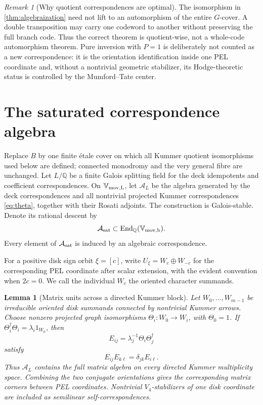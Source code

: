 \documentclass[11pt]{article}
\newtheorem{lemma}[theorem]{Lemma}
\theoremstyle{definition}
\theoremstyle{remark}
\newtheorem{remark}[theorem]{Remark}
\newcommand{\Q}{\mathbb Q}
\newcommand{\End}{\operatorname{End}}
\begin{document}
\begin{remark}[Why quotient correspondences are optimal]
The isomorphism in \cref{thm:algebraization} need not lift to an automorphism of the entire $G$-cover.  A double transposition may carry one codeword to another without preserving the full branch code.  Thus the correct theorem is quotient-wise, not a whole-code automorphism theorem.  Pure inversion with $P=1$ is deliberately not counted as a new correspondence: it is the orientation identification inside one PEL coordinate and, without a nontrivial geometric stabilizer, its Hodge-theoretic status is controlled by the Mumford--Tate center.
\end{remark}

\section{The saturated correspondence algebra}

Replace $B$ by one finite \'etale cover on which all Kummer quotient isomorphisms used below are defined; connected monodromy and the very general fibre are unchanged.  Let $L/\Q$ be a finite Galois splitting field for the deck idempotents and coefficient correspondences.  On $\mathbb V_{\rm mov,L}$, let $\mathcal A_L$ be the algebra generated by the deck correspondences and all nontrivial projected Kummer correspondences \eqref{eq:theta}, together with their Rosati adjoints.  The construction is Galois-stable.  Denote its rational descent by
\begin{equation}\label{eq:Asat}
 \mathcal A_{\rm sat}\subset\End_\Q(\mathbb V_{\rm mov,b}).
\end{equation}
Every element of $\mathcal A_{\rm sat}$ is induced by an algebraic correspondence.

For a positive disk sign orbit $\xi=[c]$, write $U_\xi=W_c\oplus W_{-c}$ for the corresponding PEL coordinate after scalar extension, with the evident convention when $2c=0$.  We call the individual $W_c$ the oriented character summands.

\begin{lemma}[Matrix units across a directed Kummer block]\label{lem:matrix-units}
Let $W_0,\ldots,W_{m-1}$ be irreducible oriented disk summands connected by nontrivial Kummer arrows.  Choose nonzero projected graph isomorphisms
$\Theta_i:W_0\to W_i$, with $\Theta_0=1$.  If
$\Theta_i^\dagger\Theta_i=\lambda_i1_{W_0}$, then
\begin{equation}\label{eq:matrix-units}
 E_{ij}=\lambda_j^{-1}\Theta_i\Theta_j^\dagger
\end{equation}
satisfy
\[
 E_{ij}E_{k\ell}=\delta_{jk}E_{i\ell}.
\]
Thus $\mathcal A_L$ contains the full matrix algebra on every directed Kummer multiplicity space.  Combining the two conjugate orientations gives the corresponding matrix corners between PEL coordinates.  Nontrivial $V_4$-stabilizers of one disk coordinate are included as semilinear self-correspondences.
\end{lemma}
\end{document}
